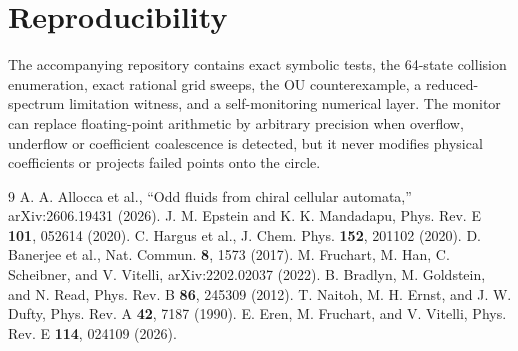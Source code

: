\documentclass[11pt]{article}
\begin{document}
\section{Reproducibility}
The accompanying repository contains exact symbolic tests, the 64-state collision enumeration, exact rational grid sweeps, the OU counterexample, a reduced-spectrum limitation witness, and a self-monitoring numerical layer.  The monitor can replace floating-point arithmetic by arbitrary precision when overflow, underflow or coefficient coalescence is detected, but it never modifies physical coefficients or projects failed points onto the circle.

\begin{thebibliography}{9}
 A. A. Allocca et al., ``Odd fluids from chiral cellular automata,'' arXiv:2606.19431 (2026).
 J. M. Epstein and K. K. Mandadapu, Phys. Rev. E \textbf{101}, 052614 (2020).
 C. Hargus et al., J. Chem. Phys. \textbf{152}, 201102 (2020).
 D. Banerjee et al., Nat. Commun. \textbf{8}, 1573 (2017).
 M. Fruchart, M. Han, C. Scheibner, and V. Vitelli, arXiv:2202.02037 (2022).
 B. Bradlyn, M. Goldstein, and N. Read, Phys. Rev. B \textbf{86}, 245309 (2012).
 T. Naitoh, M. H. Ernst, and J. W. Dufty, Phys. Rev. A \textbf{42}, 7187 (1990).
 E. Eren, M. Fruchart, and V. Vitelli, Phys. Rev. E \textbf{114}, 024109 (2026).
\end{thebibliography}
\end{document}
